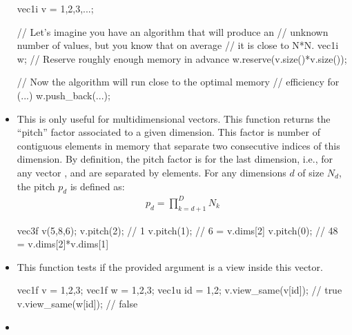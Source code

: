 \documentclass[12pt,a4paper]{report}
\newenvironment{example}
{
    \begin{mdframed}[style=example,frametitle={Example}]
}
{
    \end{mdframed}
}
\begin{document}
\begin{itemize}
\begin{example}
\begin{cppcode}
vec1i v = {1,2,3,...};

// Let's imagine you have an algorithm that will produce an
// unknown number of values, but you know that on average
// it is close to N*N.
vec1i w;
// Reserve roughly enough memory in advance
w.reserve(v.size()*v.size());

// Now the algorithm will run close to the optimal memory
// efficiency
for (...) {
    w.push_back(...);
}
\end{cppcode}
\end{example}

\item {}

This is only useful for multidimensional vectors. This function returns the ``pitch'' factor associated to a given dimension. This factor is number of contiguous elements in memory that separate two consecutive indices of this dimension. By definition, the pitch factor is  for the last dimension, i.e., for any vector ,  and  are separated by  elements. For any dimensions $d$ of size $N_d$, the pitch $p_d$ is defined as:
\begin{align}
p_d = \prod_{k=d+1}^D N_k
\end{align}

\begin{example}
\begin{cppcode}
vec3f v(5,8,6);
v.pitch(2); // 1
v.pitch(1); // 6 = v.dims[2]
v.pitch(0); // 48 = v.dims[2]*v.dims[1]
\end{cppcode}
\end{example}

\item {}

This function tests if the provided argument is a view inside this vector.

\begin{example}
\begin{cppcode}
vec1f v = {1,2,3};
vec1f w = {1,2,3};
vec1u id = {1,2};
v.view_same(v[id]); // true
v.view_same(w[id]); // false
\end{cppcode}
\end{example}

\item {}


\end{itemize}
\end{document}
